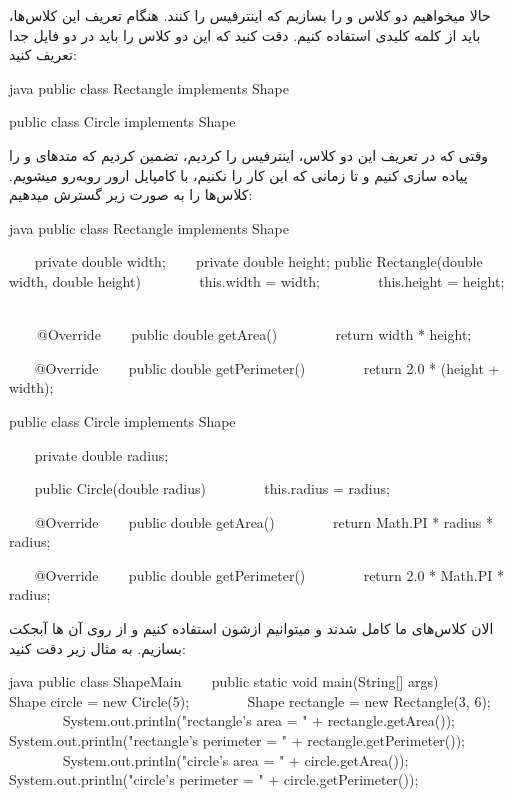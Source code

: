 حالا میخواهیم دو کلاس  و  را
بسازیم که اینترفیس  را  کنند. هنگام
تعریف این کلاس‌ها، باید از کلمه کلیدی  استفاده کنیم. دقت
کنید که این دو کلاس را باید در دو فایل جدا تعریف کنید:

\begin{codebox}{java}
public class Rectangle implements Shape {

}

  
public class Circle implements Shape {  

}
\end{codebox}

وقتی که در تعریف این دو کلاس، اینترفیس  را
 کردیم، تضمین کردیم که متدهای  و
 را پیاده سازی کنیم و تا زمانی که این کار را
نکنیم، با کامپایل ارور روبه‌رو میشویم. کلاس‌ها را به صورت زیر گسترش
میدهیم:

\begin{codebox}{java}
public class Rectangle implements Shape{
    private double width;
    private double height;
    public Rectangle(double width, double height){ 
        this.width = width;
        this.height = height;  
    } 

    @Override
    public double getArea() {
        return width * height;  
    }

    @Override
    public double getPerimeter() {
        return 2.0 * (height + width);  
    }  
}

public class Circle implements Shape{
    private double radius;

    public Circle(double radius){
        this.radius = radius;  
    }

    @Override
    public double getArea() {
        return Math.PI * radius * radius;  
    }

    @Override
    public double getPerimeter() {
        return 2.0 * Math.PI * radius;  
    }  
}
\end{codebox}

الان کلاس‌های ما کامل شدند و میتوانیم ازشون استفاده کنیم و از روی آن ها
آبجکت بسازیم. به مثال زیر دقت کنید:

\begin{codebox}{java}
public class ShapeMain {
    public static void main(String[] args){  
        Shape circle = new Circle(5);  
        Shape rectangle = new Rectangle(3, 6);  
        System.out.println("rectangle's area = " + rectangle.getArea());  
        System.out.println("rectangle's perimeter = " + rectangle.getPerimeter());  
        System.out.println("circle's area = " + circle.getArea());  
        System.out.println("circle's perimeter = " + circle.getPerimeter());  
    }  
}
\end{codebox}

